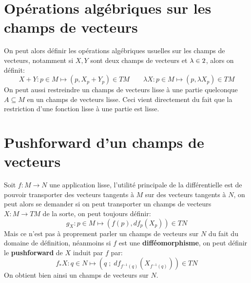   \section{Opérations algébriques sur les champs de vecteurs}
      On peut alors définir les opérations algébriques usuelles sur les champs de vecteurs, notamment si \( X, Y \) sont deux champs de vecteurs et \( \lambda \in 2 \), alors on définit:
      \[ 
         X + Y : p \in M \longmapsto (p, X_p + Y_p) \in TM \quad\quad \lambda X: p \in M \longmapsto (p, \lambda X_p) \in TM
      \]
      On peut aussi restreindre un champs de vecteurs lisse à une partie quelconque \( A \subseteq M \) en un champs de vecteurs lisse. Ceci vient directement du fait que la restriction d'une fonction lisse à une partie est lisse.
   \section{Pushforward d'un champs de vecteurs}
      Soit \( f : M \longrightarrow N \) une application lisse, l'utilité principale de la différentielle est de pouvoir transporter des vecteurs tangents à \( M \) sur des vecteurs tangents à \( N \), on peut alors se demander si on peut transporter un champs de vecteurs \( X : M \longrightarrow TM \) de la sorte, on peut toujours définir:
      \[ 
         g_X : p \in M \longmapsto (f(p), df_p(X_p)) \in TN
      \]
      Mais ce n'est pas à proprement parler un champs de vecteurs sur \( N \) du fait du domaine de définition, néanmoins si \( f \) est une \textbf{difféomorphisme}, on peut définir le \textbf{pushforward} de \( X \) induit par \( f \) par:
      \[ 
         f_*X : q \in N \longmapsto (q \; ; \; df_{f^{-1}(q)}(X_{f^{-1}(q)})) \in TN
      \]
      On obtient bien ainsi un champs de vecteurs sur \( N \).
